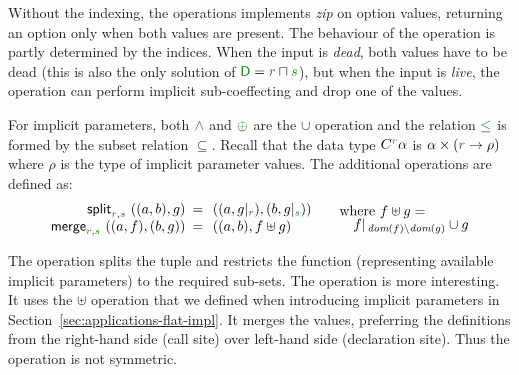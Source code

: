 \noindent
Without the indexing, the  operations implements \emph{zip} on option values,
returning an option only when both values are present. The behaviour of the  
operation is partly determined by the indices. When the input is \emph{dead}, both values have 
to be dead (this is also the only solution of $\cclrd{\ident{D}} =\cclrd{r}\sqcap\cclrd{s}$), but when
the input is \emph{live}, the operation can perform implicit sub-coeffecting and drop one of
the values.

\begin{example}
\label{thm:semantics-indexed-prod}
  
For implicit parameters, both $\czip$ and $\cpar$ are the $\cup$ operation and the relation
$\cleq$ is formed by the subset relation $\subseteq$. Recall that the data type $\ctyp{\cclrd{r}}{\alpha}$
is $\alpha \times (\cclrd{r} \rightarrow \rho)$ where $\rho$ is the type of implicit parameter values.
The additional operations are defined as:
%
\begin{equation*}
\begin{array}{rcl}
\ident{split}_{\cclrd{r}, \cclrd{s}}~((a,b), g) &\narrow{=}& ((a, \restr{g}{\cclrd{r}}), (b, \restr{g}{\cclrd{s}}))\\
\ident{merge}_{\cclrd{r}, \cclrd{s}}~((a, f), (b, g)) &\narrow{=}& ((a, b), f \uplus g)\\
\end{array}
\quad
\begin{array}{l}
\textnormal{where}~f \uplus g = \\[-0.25em]
\quad\restr{f}{\, \textit{dom}(f) \setminus \textit{dom}(g)} \cup g 
\end{array}
\end{equation*}
\end{example}

\noindent
The  operation splits the tuple and restricts the function (representing available
implicit parameters) to the required sub-sets. The  operation is more 
interesting. It uses the $\uplus$ operation that we defined when introducing implicit parameters
in Section~\ref{sec:applications-flat-impl}. It merges the values, preferring the definitions from
the right-hand side (call site) over left-hand side (declaration site). Thus the operation is not
symmetric.

